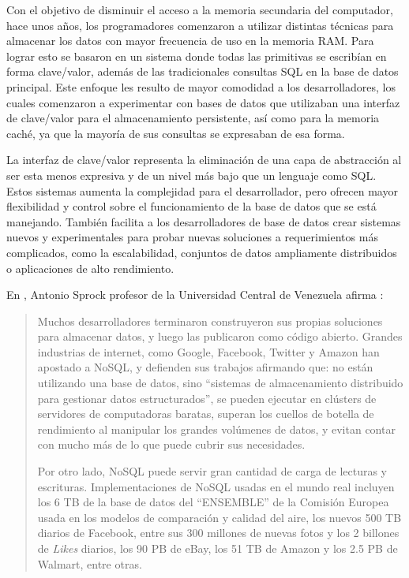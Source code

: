 Con el objetivo de disminuir el acceso a la memoria secundaria del computador, hace unos años, los programadores comenzaron a utilizar distintas técnicas para almacenar los datos con mayor frecuencia de uso en la memoria RAM. Para lograr esto se basaron en un sistema donde todas las primitivas se escribían en forma clave/valor, además de las tradicionales consultas SQL en la
base de datos principal. Este enfoque les resulto de mayor comodidad a los desarrolladores, los cuales 
comenzaron a experimentar con bases de datos que utilizaban una interfaz de clave/valor para
el almacenamiento persistente, así como para la memoria caché, ya que la mayoría de sus consultas se expresaban de esa forma.\cite{dataglossary}

La interfaz de clave/valor representa la eliminación de una capa de abstracción al ser esta menos expresiva y de un nivel más bajo que un lenguaje como SQL. Estos sistemas aumenta la complejidad para el desarrollador, pero ofrecen mayor flexibilidad y control sobre el funcionamiento de la base de datos que se está manejando. También facilita a los desarrolladores de base de datos crear sistemas nuevos y experimentales para probar nuevas soluciones a requerimientos más complicados, como la escalabilidad, conjuntos de datos ampliamente distribuidos o aplicaciones de alto rendimiento.\cite{dataglossary}

En \cite{sprock}, Antonio Sprock profesor de la Universidad Central de Venezuela afirma :
\begin{quotation}
Muchos desarrolladores terminaron construyeron sus propias soluciones para almacenar datos,
y luego las publicaron como código abierto. Grandes industrias de internet, como Google,
Facebook, Twitter y Amazon han apostado a NoSQL, y defienden sus trabajos afirmando que:
no están utilizando una base de datos, sino “sistemas de almacenamiento distribuido para
gestionar datos estructurados”, se pueden ejecutar en clústers de servidores de computadoras
baratas, superan los cuellos de botella de rendimiento al manipular los grandes volúmenes de
datos, y evitan contar con mucho más de lo que puede cubrir sus necesidades. 

Por otro lado, NoSQL puede servir gran cantidad de carga de lecturas y escrituras. Implementaciones de NoSQL usadas en el mundo real incluyen los 6 TB de la base de datos del “ENSEMBLE” de la Comisión Europea usada en los modelos de comparación y calidad del aire, los nuevos 500 TB diarios de Facebook, entre sus 300 millones de nuevas fotos y los 2 billones de \textit{Likes} diarios, los 90 PB de eBay, los 51 TB de Amazon y los 2.5 PB de Walmart, entre otras.
\end{quotation}

